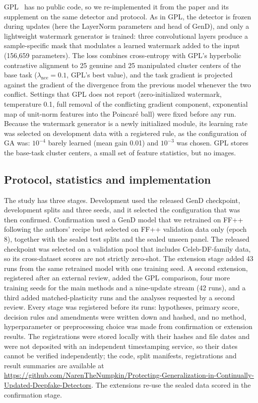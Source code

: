 \documentclass{ieeeaccess}
\newcommand{\ffpp}{FF{+}{+}}
\begin{document}
GPL~\cite{zhang2025gpl} has no public code, so we re-implemented it from the paper and its supplement on the same detector and protocol. As in GPL, the detector is frozen during updates (here the LayerNorm parameters and head of GenD), and only a lightweight watermark generator is trained: three convolutional layers produce a sample-specific mask that modulates a learned watermark added to the input (156{,}659 parameters). The loss combines cross-entropy with GPL's hyperbolic contrastive alignment to 25 genuine and 25 manipulated cluster centers of the base task ($\lambda_{\mathrm{nce}}=0.1$, GPL's best value), and the task gradient is projected against the gradient of the divergence from the previous model whenever the two conflict. Settings that GPL does not report (zero-initialized watermark, temperature 0.1, full removal of the conflicting gradient component, exponential map of unit-norm features into the Poincar\'e ball) were fixed before any run. Because the watermark generator is a newly initialized module, its learning rate was selected on development data with a registered rule, as the configuration of GA was: $10^{-4}$ barely learned (mean gain 0.01) and $10^{-3}$ was chosen. GPL stores the base-task cluster centers, a small set of feature statistics, but no images.

\subsection{Protocol, statistics and implementation}
The study has three stages. Development used the released GenD checkpoint, development splits and three seeds, and it selected the configuration that was then confirmed. Confirmation used a GenD model that we retrained on \ffpp{} following the authors' recipe but selected on \ffpp{} validation data only (epoch 8), together with the sealed test splits and the sealed unseen panel. The released checkpoint was selected on a validation pool that includes Celeb-DF-family data, so its cross-dataset scores are not strictly zero-shot. The extension stage added 43 runs from the same retrained model with one training seed. A second extension, registered after an external review, added the GPL comparison, four more training seeds for the main methods and a nine-update stream (42 runs), and a third added matched-plasticity runs and the analyses requested by a second review. Every stage was registered before its runs: hypotheses, primary score, decision rules and amendments were written down and hashed, and no method, hyperparameter or preprocessing choice was made from confirmation or extension results. The registrations were stored locally with their hashes and file dates and were not deposited with an independent timestamping service, so their dates cannot be verified independently; the code, split manifests, registrations and result summaries are available at \url{https://github.com/NarenTheNumpkin/Protecting-Generalization-in-Continually-Updated-Deepfake-Detectors}. The extensions re-use the sealed data scored in the confirmation stage.
\end{document}
